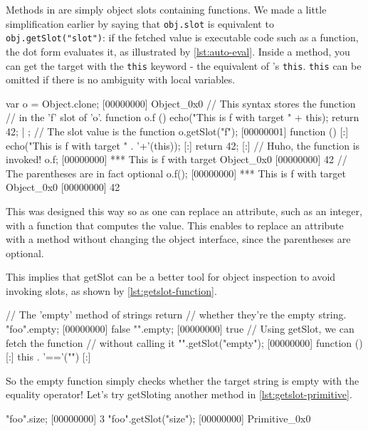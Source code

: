 \documentclass[openright,twoside,12pt]{report}
\begin{document}
Methods in \urbi are simply object slots containing functions. We made
a little simplification earlier by saying that \lstinline|obj.slot| is
equivalent to \lstinline|obj.getSlot("slot")|: if the fetched value is
executable code such as a function, the dot form evaluates it, as
illustrated by \autoref{lst:auto-eval}. Inside a method, you can get the
target with the \lstinline|this| keyword - the equivalent of \Cxx's
\texttt{this}. \lstinline|this| can be omitted if there is no
ambiguity with local variables.

\begin{urbiscript}[caption=Function in object are automatically evaluated,
label=lst:auto-eval]
var o = Object.clone;
[00000000] Object_0x0
// This syntax stores the function
// in the 'f' slot of 'o'.
function o.f ()
{
  echo("This is f with target " + this);
  return 42;
} | {};
// The slot value is the function
o.getSlot("f");
[00000001] function () {
[:]  echo("This is f with target " . '+'(this));
[:]  return 42;
[:]}
// Huho, the function is invoked!
o.f;
[00000000] *** This is f with target Object_0x0
[00000000] 42
// The parentheses are in fact optional
o.f();
[00000000] *** This is f with target Object_0x0
[00000000] 42
\end{urbiscript}

This was designed this way so as one can replace an attribute, such as
an integer, with a function that computes the value. This enables to
replace an attribute with a method without changing the object
interface, since the parentheses are optional.

This implies that getSlot can be a better tool for object inspection
to avoid invoking slots, as shown by \autoref{lst:getslot-function}.

\begin{urbiscript}[caption=Inspecting executable slots with \texttt{getSlot},
label=lst:getslot-function]
// The 'empty' method of strings return
// whether they're the empty string.
"foo".empty;
[00000000] false
"".empty;
[00000000] true
// Using getSlot, we can fetch the function
// without calling it
"".getSlot("empty");
[00000000] function () {
[:]  this . '=='("")
[:]}
\end{urbiscript}

So the empty function simply checks whether the target string is empty
with the equality operator! Let's try getSloting another method in
\autoref{lst:getslot-primitive}.

\begin{urbiscript}[caption=Primitives, label=lst:getslot-primitive]
"foo".size;
[00000000] 3
"foo".getSlot("size");
[00000000] Primitive_0x0
\end{urbiscript}
\end{document}
